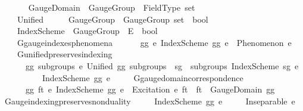 \begin{isabellebody}
\ \ \isamarkupfalse%
\isanewline
\ \ \ \ GaugeDomain\ {\isacharcolon}{\kern0pt}{\isacharcolon}{\kern0pt}\ {\isachardoublequoteopen}GaugeGroup\ {\isasymRightarrow}\ FieldType\ set{\isachardoublequoteclose}\ \ \ \isanewline
\ \ \ \ Unified\ \ \ \ \ {\isacharcolon}{\kern0pt}{\isacharcolon}{\kern0pt}\ {\isachardoublequoteopen}GaugeGroup\ {\isasymRightarrow}\ GaugeGroup\ set\ {\isasymRightarrow}\ bool{\isachardoublequoteclose}\ \ \isanewline
\ \ \ \ IndexScheme\ {\isacharcolon}{\kern0pt}{\isacharcolon}{\kern0pt}\ {\isachardoublequoteopen}GaugeGroup\ {\isasymRightarrow}\ E\ {\isasymRightarrow}\ bool{\isachardoublequoteclose}\ \ \ \ \ \ \isanewline
\isanewline
\ \ \isamarkupfalse%
\ \isanewline
\ \ \ \ G{}{\isacharunderscore}{\kern0pt}gauge{\isacharunderscore}{\kern0pt}indexes{\isacharunderscore}{\kern0pt}phenomena{\isacharcolon}{\kern0pt}\isanewline
\ \ \ \ \ \ {\isachardoublequoteopen}{\isasymforall}gg\ e{\isachardot}{\kern0pt}\ IndexScheme\ gg\ e\ {\isasymlongrightarrow}\ Phenomenon\ e{\isachardoublequoteclose}\ \isanewline
\ \ \ \ G{}{\isacharunderscore}{\kern0pt}unified{\isacharunderscore}{\kern0pt}preserves{\isacharunderscore}{\kern0pt}indexing{\isacharcolon}{\kern0pt}\isanewline
\ \ \ \ \ \ {\isachardoublequoteopen}{\isasymforall}gg\ subgroups\ e{\isachardot}{\kern0pt}\ Unified\ gg\ subgroups\ {\isasymand}\ {\isacharparenleft}{\kern0pt}{\isasymexists}sg\ {\isasymin}\ subgroups{\isachardot}{\kern0pt}\ IndexScheme\ sg\ e{\isacharparenright}{\kern0pt}\isanewline
\ \ \ \ \ \ \ \ \ {\isasymlongrightarrow}\ IndexScheme\ gg\ e{\isachardoublequoteclose}\ \isanewline
\ \ \ \ G{}{\isacharunderscore}{\kern0pt}gauge{\isacharunderscore}{\kern0pt}domain{\isacharunderscore}{\kern0pt}correspondence{\isacharcolon}{\kern0pt}\isanewline
\ \ \ \ \ \ {\isachardoublequoteopen}{\isasymforall}gg\ ft\ e{\isachardot}{\kern0pt}\ IndexScheme\ gg\ e\ {\isasymand}\ Excitation\ e\ ft\ {\isasymlongrightarrow}\ ft\ {\isasymin}\ GaugeDomain\ gg{\isachardoublequoteclose}\isanewline
\isanewline
\ \ \isamarkupfalse%
\ Gauge{\isacharunderscore}{\kern0pt}indexing{\isacharunderscore}{\kern0pt}preserves{\isacharunderscore}{\kern0pt}nonduality{\isacharcolon}{\kern0pt}\isanewline
\ \ \ \ \ {\isachardoublequoteopen}IndexScheme\ gg\ e{\isachardoublequoteclose}\isanewline
\ \ \ \ \ {\isachardoublequoteopen}Inseparable\ e\ {\isasymOmega}{\isachardoublequoteclose}\isanewline
%
\isadelimproof
\ \ \ \ %

\end{isabellebody}

